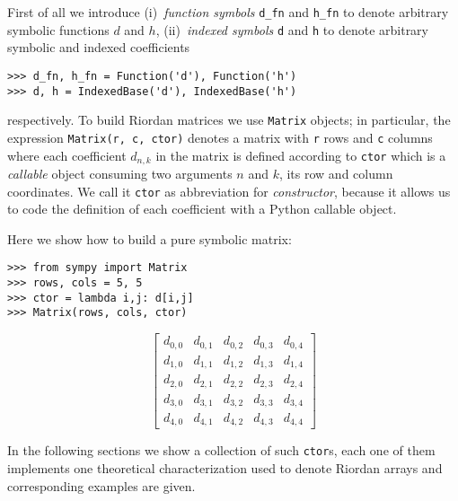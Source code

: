 First of all we introduce (i)~\textit{function symbols} \verb|d_fn| and
\verb|h_fn| to denote arbitrary symbolic functions $d$ and $h$,
(ii)~\textit{indexed symbols} \verb|d| and \verb|h| to denote arbitrary
symbolic and indexed coefficients
\begin{verbatim}
>>> d_fn, h_fn = Function('d'), Function('h')
>>> d, h = IndexedBase('d'), IndexedBase('h')
\end{verbatim}
respectively. To build Riordan matrices we use \verb|Matrix| objects; in
particular, the expression \verb|Matrix(r, c, ctor)| denotes a matrix with
\verb|r| rows and \verb|c| columns where each coefficient $d_{n,k}$ in the
matrix is defined according to \verb|ctor| which is a \textit{callable}
 object consuming two arguments $n$ and $k$, its row and column
coordinates.  We call it \verb|ctor| as abbreviation for \textit{constructor},
because it allows us to code the definition of each coefficient with a Python
callable object.

Here we show how to build a pure symbolic matrix:
\begin{verbatim}
>>> from sympy import Matrix
>>> rows, cols = 5, 5
>>> ctor = lambda i,j: d[i,j]
>>> Matrix(rows, cols, ctor)
\end{verbatim}
\begin{displaymath}
\left[\begin{matrix}d_{0,0} & d_{0,1} & d_{0,2} & d_{0,3} & d_{0,4}\\d_{1,0} & d_{1,1} & d_{1,2} & d_{1,3} & d_{1,4}\\d_{2,0} & d_{2,1} & d_{2,2} & d_{2,3} & d_{2,4}\\d_{3,0} & d_{3,1} & d_{3,2} & d_{3,3} & d_{3,4}\\d_{4,0} & d_{4,1} & d_{4,2} & d_{4,3} & d_{4,4}\end{matrix}\right]
\end{displaymath}

In the following sections we show a collection of such \verb|ctor|s, each one
of them implements one theoretical characterization used to denote Riordan
arrays and corresponding examples are given.

